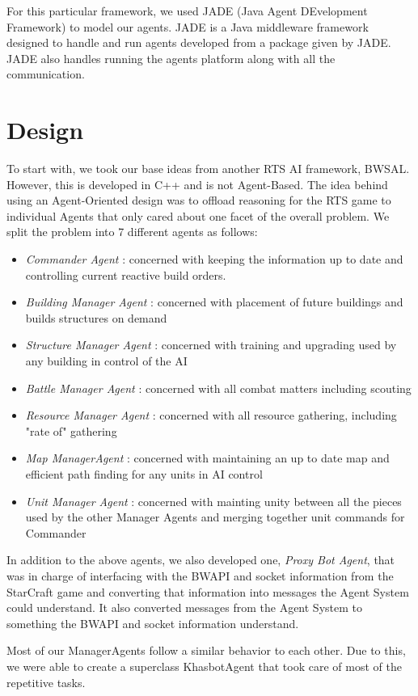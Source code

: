 \documentclass[letterpaper]{article}
\begin{document}
For this particular framework, we used JADE (Java Agent DEvelopment Framework) to model our agents.  JADE is a Java middleware framework designed to handle and run agents developed from a package given by JADE.  JADE also handles running the agents platform along with all the communication.

\section{Design}
To start with, we took our base ideas from another RTS AI framework, BWSAL.  However, this is developed in C++ and is not Agent-Based. The idea behind using an Agent-Oriented design was to offload reasoning for the RTS game to individual Agents that only cared about one facet of the overall problem.  We split the problem into 7 different agents as follows:
\begin{itemize}
\item \emph{Commander Agent} : concerned with keeping the information up to date and controlling current reactive build orders.
\item \emph{Building Manager Agent} :  concerned with placement of future buildings and builds structures on demand
\item \emph{Structure Manager Agent} : concerned with training and upgrading used by any building in control of the AI
\item \emph{Battle Manager Agent} : concerned with all combat matters including scouting
\item \emph{Resource Manager Agent} : concerned with all resource gathering, including "rate of" gathering
\item \emph{Map ManagerAgent} : concerned with maintaining an up to date map and efficient path finding for any units in AI control
\item \emph{Unit Manager Agent} : concerned with mainting unity between all the pieces used by the other Manager Agents and merging together unit commands for Commander
\end{itemize}

In addition to the above agents, we also developed one, \emph{Proxy Bot Agent}, that was in charge of interfacing with the BWAPI and socket information from the StarCraft game and converting that information into messages the Agent System could understand.  It also converted messages from the Agent System to something the BWAPI and socket information understand.

Most of our ManagerAgents follow a similar behavior to each other. Due to this, we were able to create a superclass KhasbotAgent that took care of most of the repetitive tasks.
\end{document}
